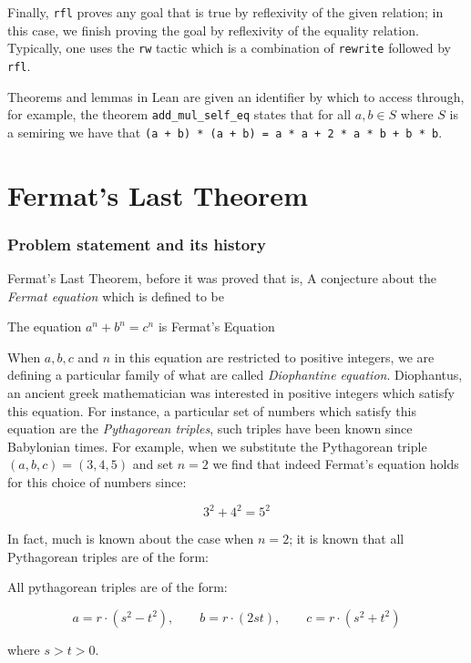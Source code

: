 \begin{example}
    Finally, \texttt{rfl} proves any goal that is true by reflexivity of the given relation; in this case, we finish proving the goal by reflexivity of the equality relation. Typically, one
    uses the \texttt{rw} tactic which is a combination of \texttt{rewrite} followed by \texttt{rfl}.

    Theorems and lemmas in Lean are given an identifier by which to access through, for example, the theorem \texttt{add\_mul\_self\_eq} states that for all $a, b \in S$ where $S$ is a semiring
    we have that \texttt{(a + b) * (a + b) = a * a + 2 * a * b + b * b}.
\end{example}


\section{Fermat's Last Theorem}


\subsubsection{Problem statement and its history}
Fermat's Last Theorem, before it was proved that is, A conjecture about the \textit{Fermat equation} which is defined to be

\begin{definition}
    The equation $a^n + b^n = c^n$ is Fermat's Equation
\end{definition}

When $a, b, c$ and $n$ in this equation are restricted to positive integers, we are defining a particular family of what are called \textit{Diophantine equation}.
Diophantus, an ancient greek mathematician was interested in positive integers which satisfy this equation. For instance, a particular set of numbers which satisfy this equation 
are the \textit{Pythagorean triples}, such triples have been known since Babylonian times. For example, when we substitute the Pythagorean triple $(a,b,c) = (3,4,5)$ and set $n = 2$ we find that 
indeed Fermat's equation holds for this choice of numbers since:

\[
3^2 + 4^2 = 5^2
\]

In fact, much is known about the case when $n = 2$; it is known that all Pythagorean triples are of the form:

\begin{theorem}
    All pythagorean triples are of the form:

    \[
    a = r \cdot (s^2 - t^2), \qquad b = r \cdot (2st), \qquad c = r \cdot (s^2 + t^2)
    \]

    where $s > t > 0$.
\end{theorem}

